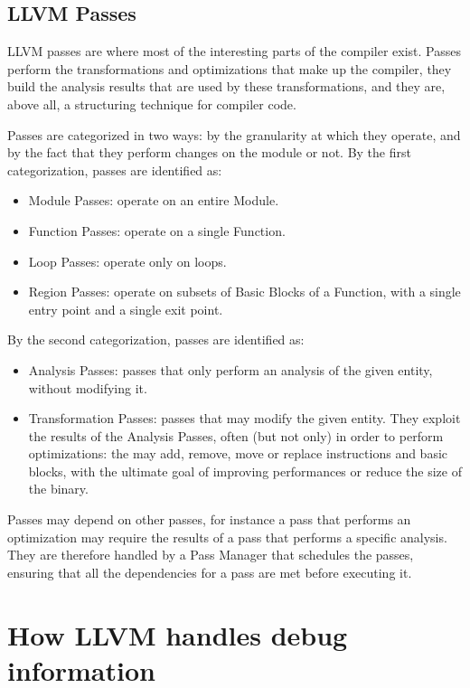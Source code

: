 \subsection{LLVM Passes\label{sec:llvm-passes}}
LLVM passes are where most of the interesting parts of the compiler exist. Passes perform the transformations and optimizations that make up the compiler, they build the analysis results that are used by these transformations, and they are, above all, a structuring technique for compiler code. \par
Passes are categorized in two ways: by the granularity at which they operate, and by the fact that they perform changes on the module or not. \newline
By the first categorization, passes are identified as:
\begin{itemize}
\item Module Passes: operate on an entire Module.
\item Function Passes: operate on a single Function.
\item Loop Passes: operate only on loops.
\item Region Passes: operate on subsets of Basic Blocks of a Function, with a single entry point and a single exit point.
\end{itemize}
By the second categorization, passes are identified as:
\begin{itemize}
\item Analysis Passes: passes that only perform an analysis of the given entity, without modifying it. 
\item Transformation Passes: passes that may modify the given entity. They exploit the results of the Analysis Passes, often (but not only) in order to perform optimizations: the may add, remove, move or replace instructions and basic blocks, with the ultimate goal of improving performances or reduce the size of the binary.
\end{itemize} \par 
Passes may depend on other passes, for instance a pass that performs an optimization may require the results of a pass that performs a specific analysis.
They are therefore handled by a Pass Manager that schedules the passes, ensuring that all the dependencies for a pass are met before executing it. 

\section{How LLVM handles debug information\label{sec:llvm-dbg}}

